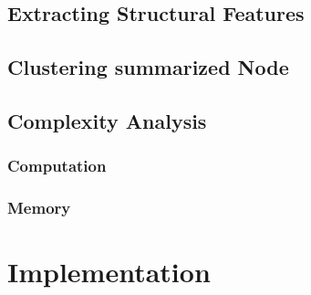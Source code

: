 \subsection{Extracting Structural Features}
\subsection{Clustering summarized Node}

\subsection{Complexity Analysis}
\subsubsection{Computation}
\subsubsection{Memory}

\section{Implementation}